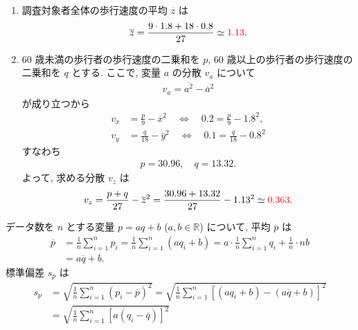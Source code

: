 \begin{qenumerate}
{\begin{enumerate}
{\begin{figure}[H]
				\end{figure}
			}
		\end{enumerate}
	}
	\item{
		\begin{enumerate}
			\item{
				調査対象者全体の歩行速度の平均 $\overline{z}$ は
				\begin{align}
					\overline{z} = \frac{9\cdot 1.8 + 18\cdot 0.8}{27} \simeq \textcolor{red}{1.13}.
				\end{align}
			}
			\item{
				60 歳未満の歩行者の歩行速度の二乗和を $p$, 60 歳以上の歩行者の歩行速度の二乗和を $q$ とする.
				ここで, 変量 $a$ の分散 $v_{a}$ について
				\begin{align}
					v_{a} = \overline{a^{2}} - {\overline{a}}^{2}
				\end{align}
				が成り立つから
				\begin{align}
					v_{x} &= \frac{p}{9} - \overline{x}^{2} \quad\Leftrightarrow\quad 0.2 = \frac{p}{9} - 1.8^{2}, \\
					v_{y} &= \frac{q}{18} - \overline{y}^{2} \quad\Leftrightarrow\quad 0.1 = \frac{q}{18} - 0.8^{2}
				\end{align}
				すなわち
				\begin{align}
					p = 30.96,\quad q = 13.32.
				\end{align}
				よって, 求める分散 $v_{z}$ は
				\begin{align}
					v_{z} = \frac{p + q}{27} - {\overline{z}}^{2} = \frac{30.96 + 13.32}{27} - 1.13^2 \simeq \textcolor{red}{0.363}.
				\end{align}
			}
		\end{enumerate}
	}
	\item{
		データ数を $n$ とする変量 $p = aq + b$ ($a, b\in\mathbb{R}$) について, 平均 $\overline{p}$ は
		\begin{align}
			\overline{p} &= \frac{1}{n}\sum_{i = 1}^{n}{p_{i}} = \frac{1}{n}\sum_{i = 1}^{n}{\left(aq_{i} + b\right)} = a\cdot \frac{1}{n}\sum_{i = 1}^{n}{q_{i}} + \frac{1}{n}\cdot nb \\
				&= a\overline{q} + b.
		\end{align}
		標準偏差 $s_{p}$ は
		\begin{align}
			s_{p} &= \sqrt{\frac{1}{n}\sum_{i = 1}^{n}{\left(p_{i} - \overline{p}\right)^{2}}} = \sqrt{\frac{1}{n}\sum_{i = 1}^{n}{\left[\left(aq_{i} + b\right) - \left(a\overline{q} + b\right)\right]^{2}}} \\
				&= \sqrt{\frac{1}{n}\sum_{i = 1}^{n}{\left[a\left(q_{i} - \overline{q}\right)\right]^{2}}} \\

\end{align}}
\end{qenumerate}
